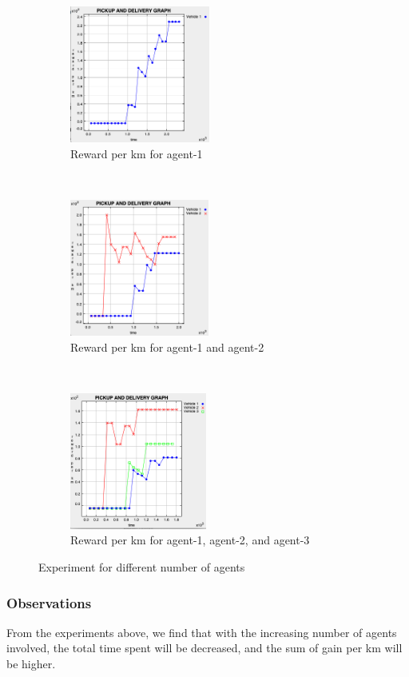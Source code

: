 \documentclass[10.5pt]{article}
\begin{document}
\begin{figure}[h]
    \centering
    \begin{subfigure}{.3\textwidth}
        \includegraphics[width = \textwidth, height=4.5cm]{1agent-8task.png}
        \caption{Reward per km for agent-1}
        \label{fig:growth-2-energy-100}
    \end{subfigure}%
    ~
    \begin{subfigure}{.3\textwidth}
        \includegraphics[width = \textwidth, height=4.5cm]{2agent-8task.png}
        \caption{Reward per km for agent-1 and agent-2}
        \label{fig:energy-100-startEnergy-15-world-100-100}
    \end{subfigure}
    ~
    \begin{subfigure}{.3\textwidth}
        \includegraphics[width = \textwidth, height=4.5cm]{3agent-8task.png}
        \caption{Reward per km for agent-1, agent-2, and agent-3}
    \end{subfigure}
    \caption{Experiment for different number of agents}\label{fig:exp-3}
\end{figure}

\subsubsection{Observations}
From the experiments above, we find that with the increasing number of agents involved, the total time spent will be decreased, and the sum of gain per km will be higher.
\end{document}
